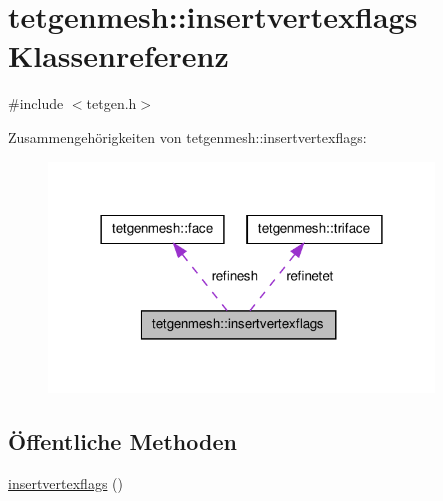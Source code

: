 \hypertarget{classtetgenmesh_1_1insertvertexflags}{\section{tetgenmesh\-:\-:insertvertexflags Klassenreferenz}
\label{classtetgenmesh_1_1insertvertexflags}
}


{\ttfamily \#include $<$tetgen.\-h$>$}



Zusammengehörigkeiten von tetgenmesh\-:\-:insertvertexflags\-:\nopagebreak
\begin{figure}[H]
\begin{center}
\leavevmode
\includegraphics[width=290pt]{classtetgenmesh_1_1insertvertexflags__coll__graph}
\end{center}
\end{figure}
\subsection*{Öffentliche Methoden}
\begin{DoxyCompactItemize}
\item 
\hyperlink{classtetgenmesh_1_1insertvertexflags_af7e418fe9c850fd55757152189e8c6ee}{insertvertexflags} ()
\end{DoxyCompactItemize}
